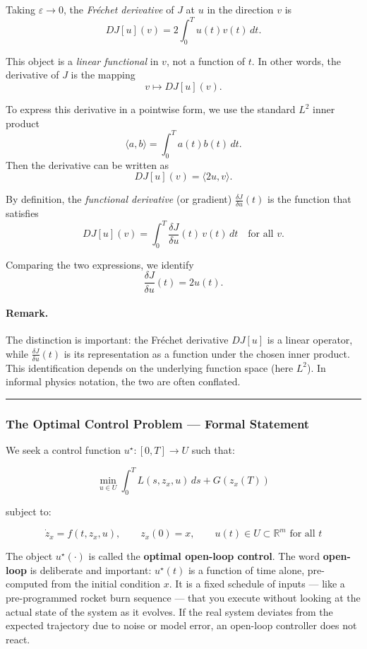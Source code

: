 \documentclass{article}
\begin{document}
\begin{mathrequirementsbox}
Taking $\varepsilon \to 0$, the \emph{Fréchet derivative} of $J$ at $u$ in the direction $v$ is
\[
DJ[u](v) = 2 \int_0^T u(t)v(t)\,dt.
\]

This object is a \emph{linear functional} in $v$, not a function of $t$. In other words, the derivative of $J$ is the mapping
\[
v \mapsto DJ[u](v).
\]

To express this derivative in a pointwise form, we use the standard $L^2$ inner product
\[
\langle a, b \rangle = \int_0^T a(t)b(t)\,dt.
\]
Then the derivative can be written as
\[
DJ[u](v) = \langle 2u, v \rangle.
\]

By definition, the \emph{functional derivative} (or gradient) $\frac{\delta J}{\delta u}(t)$ is the function that satisfies
\[
DJ[u](v) = \int_0^T \frac{\delta J}{\delta u}(t)\, v(t)\, dt
\quad \text{for all } v.
\]

Comparing the two expressions, we identify
\[
\frac{\delta J}{\delta u}(t) = 2u(t).
\]

\paragraph{Remark.}
The distinction is important: the Fréchet derivative $DJ[u]$ is a linear operator, while $\frac{\delta J}{\delta u}(t)$ is its representation as a function under the chosen inner product. This identification depends on the underlying function space (here $L^2$). In informal physics notation, the two are often conflated.
\end{mathrequirementsbox}

\medskip\hrule\medskip

\subsubsection{The Optimal Control Problem --- Formal Statement}

We seek a control function $u^\star : [0,T] \to U$ such that:

$$\min_{u \in U} \int_0^T L(s, z_x, u)\, ds + G(z_x(T))$$

subject to:

\begin{equation}
\dot{z}_x = f(t, z_x, u), \qquad z_x(0) = x, \qquad u(t) \in U \subset \mathbb{R}^m \text{ for all } t
\label{eq:ocp-dynamics}
\end{equation}

The object $u^\star(\cdot)$ is called the \textbf{optimal open-loop control}. The word \textbf{open-loop} is deliberate and important: $u^\star(t)$ is a function of time alone, pre-computed from the initial condition $x$. It is a fixed schedule of inputs — like a pre-programmed rocket burn sequence — that you execute without looking at the actual state of the system as it evolves. If the real system deviates from the expected trajectory due to noise or model error, an open-loop controller does not react.
\end{document}
